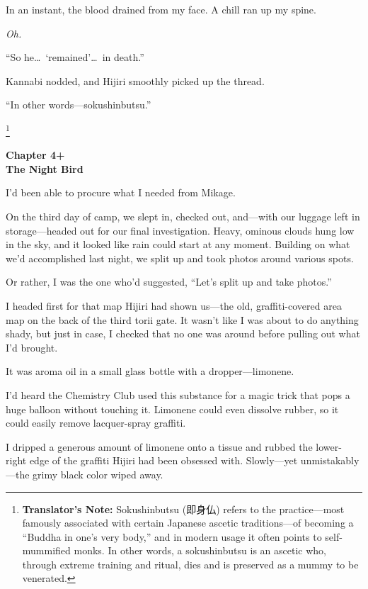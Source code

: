 \documentclass[
    a4paper,
    12pt,
    twoside,
    openany,
    UTF8,
    fontset=windows
]{ctexbook}
\begin{document}
In an instant, the blood drained from my face. A chill ran up my spine.

\textit{Oh.}

``So he\dots\ `remained'\dots\ in death.''

Kannabi nodded, and Hijiri smoothly picked up the thread.

``In other words---sokushinbutsu.''

\footnote{\textbf{Translator's Note:} Sokushinbutsu (即身仏) refers to the practice---most famously associated with certain Japanese ascetic traditions---of becoming a ``Buddha in one's very body,'' and in modern usage it often points to self-mummified monks. In other words, a sokushinbutsu is an ascetic who, through extreme training and ritual, dies and is preserved as a mummy to be venerated.}

\clearpage
\thispagestyle{plain}
\begin{center}
    \large\bfseries
    Chapter 4+\\
    The Night Bird
\end{center}
\label{sec:ch4p}
\vspace{1cm}

I'd been able to procure what I needed from Mikage.

On the third day of camp, we slept in, checked out, and---with our luggage left in storage---headed out for our final investigation. Heavy, ominous clouds hung low in the sky, and it looked like rain could start at any moment. Building on what we'd accomplished last night, we split up and took photos around various spots.

Or rather, I was the one who'd suggested, ``Let's split up and take photos.''

I headed first for that map Hijiri had shown us---the old, graffiti-covered area map on the back of the third torii gate. It wasn't like I was about to do anything shady, but just in case, I checked that no one was around before pulling out what I'd brought.

It was aroma oil in a small glass bottle with a dropper---limonene.

I'd heard the Chemistry Club used this substance for a magic trick that pops a huge balloon without touching it. Limonene could even dissolve rubber, so it could easily remove lacquer-spray graffiti.

I dripped a generous amount of limonene onto a tissue and rubbed the lower-right edge of the graffiti Hijiri had been obsessed with. Slowly---yet unmistakably---the grimy black color wiped away.
\end{document}
